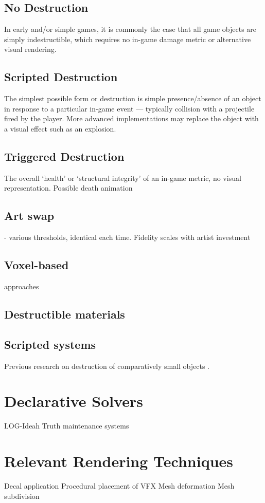 \documentclass[11pt]{report}
\begin{document}
		\subsection{No Destruction}
			In early and/or simple games, it is commonly the case that all game objects are simply indestructible, which requires no in-game damage metric or alternative visual rendering.

		\subsection{Scripted Destruction}
			The simplest possible form or destruction is simple presence/absence of an object in response to a particular in-game event --- typically collision with a projectile fired by the player. More advanced implementations may replace the object with a visual effect such as an explosion.

		\subsection{Triggered Destruction}
			The overall `health' or `structural integrity' of an 
		in-game metric, no visual representation. Possible death animation

		\subsection{Art swap} - various thresholds, identical each time. Fidelity scales with artist investment
		\subsection{Voxel-based} approaches
		\subsection{Destructible materials}
		\subsection{Scripted systems}

		Previous research on destruction of comparatively small objects \cite{van2011procedural}.
	\section{Declarative Solvers}
		LOG-Ideah \cite{novelli2012log}
		Truth maintenance systems

	\section{Relevant Rendering Techniques}
		Decal application
		Procedural placement of VFX
		Mesh deformation
		Mesh subdivision
\end{document}

